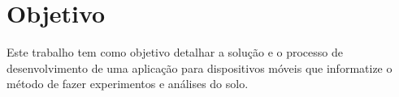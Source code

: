 



\section{Objetivo}
\label{sec:objetivo}

Este trabalho tem como objetivo detalhar a solução e o processo de desenvolvimento de uma aplicação para dispositivos móveis que informatize o método de fazer experimentos e análises do solo.


